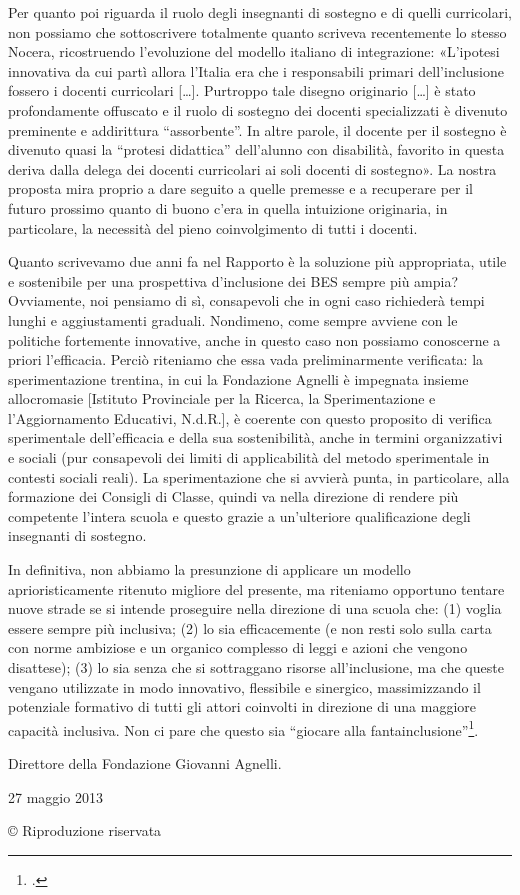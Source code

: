 Per quanto poi riguarda il ruolo degli insegnanti di sostegno e di quelli curricolari, non possiamo che sottoscrivere totalmente quanto scriveva recentemente lo stesso Nocera, ricostruendo l'evoluzione del modello italiano di integrazione: «L'ipotesi innovativa da cui partì allora l’Italia era che i responsabili primari dell'inclusione fossero i docenti curricolari […]. Purtroppo tale disegno originario […] è stato profondamente offuscato e il ruolo di sostegno dei docenti specializzati è divenuto preminente e addirittura “assorbente”. In altre parole, il docente per il sostegno è divenuto quasi la “protesi didattica” dell'alunno con disabilità, favorito in questa deriva dalla delega dei docenti curricolari ai soli docenti di sostegno».
La nostra proposta mira proprio a dare seguito a quelle premesse e a recuperare per il futuro prossimo quanto di buono c'era in quella intuizione originaria, in particolare, la necessità del pieno coinvolgimento di tutti i docenti.

Quanto scrivevamo due anni fa nel Rapporto è la soluzione più appropriata, utile e sostenibile per una prospettiva d'inclusione dei BES sempre più ampia? Ovviamente, noi pensiamo di sì, consapevoli che in ogni caso richiederà tempi lunghi e aggiustamenti graduali. Nondimeno, come sempre avviene con le politiche fortemente innovative, anche in questo caso non possiamo conoscerne a priori l'efficacia.
Perciò riteniamo che essa vada preliminarmente verificata: la sperimentazione trentina, in cui la Fondazione Agnelli è impegnata insieme allocromasie [Istituto Provinciale per la Ricerca, la Sperimentazione e l'Aggiornamento Educativi, N.d.R.], è coerente con questo proposito di verifica sperimentale dell'efficacia e della sua sostenibilità, anche in termini organizzativi e sociali (pur consapevoli dei limiti di applicabilità del metodo sperimentale in contesti sociali reali). La sperimentazione che si avvierà punta, in particolare, alla formazione dei Consigli di Classe, quindi va nella direzione di rendere più competente l'intera scuola e questo grazie a un'ulteriore qualificazione degli insegnanti di sostegno.

In definitiva, non abbiamo la presunzione di applicare un modello aprioristicamente ritenuto migliore del presente, ma riteniamo opportuno tentare nuove strade se si intende proseguire nella direzione di una scuola che: (1) voglia essere sempre più inclusiva; (2) lo sia efficacemente (e non resti solo sulla carta con norme ambiziose e un organico complesso di leggi e azioni che vengono disattese); (3) lo sia senza che si sottraggano risorse all'inclusione, ma che queste vengano utilizzate in modo innovativo, flessibile e sinergico, massimizzando il potenziale formativo di tutti gli attori coinvolti in direzione di una maggiore capacità inclusiva.
Non ci pare che questo sia “giocare alla fantainclusione”\footcite{Gavosto2013}.

Direttore della Fondazione Giovanni Agnelli.

27 maggio 2013

© Riproduzione riservata